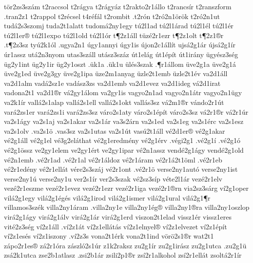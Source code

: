 {t^^f6r2zs3sz^^e1m
t2raccsol
t2r^^e1gya
t2r^^e1gy^^e1z
t2rakto2r1^^e1llo
t2rancs^^edr
t2ranszform
.tran2z1
t2rappol
t2r^^e9csel
t4r^^e9f^^e1l
t2rombit
.t2r^^f3n
t2r^^f32n1^^f6r^^f6k
t2r^^f32n1ut
tud^^e12s3szomj
tuda2t1alatt
tudom^^e12ny1egy
t^^fa2l1ad
t^^fa2l1^^e1rad
t^^fa2l1^^e9l
t^^fa2l1^^e9r
t^^fa2l1er^^ae
t^^fa2l1expo
t^^fa2l1old
t^^fa2l1^^f3r
t^^b62z1^^e1ll
t^^fcz^^e92r1ezr
t^^b62z1olt
t^^b62z1^^aer
.t^^b62z3sz
ty^^fa2k1^^f3l
.ugya2n1
^^fagy1annyi
^^fagy1is
^^fajon2c1^^e1ll^^edt
ujs^^e12g1^^e1r
^^fajs^^e12g1^^edr
^^far1assz
ut^^e12n3nyom
utas3sz^^e1ll
ut^^e1sz3sz^^e1z
^^fat1el^^e1g
^^fat1^^e9p^^edt
^^fat1ir^^e1ny
^^fcgy^^e9sz3s^^e9g
^^fcg2y1int
^^fcg2y1ir
^^fcg2y1oszt
.^^fck1a
.^^fck1u
^^fcl^^e9s3szak
.^^b6r1^^e1llom
^^fcve2g1a
^^fcve2g1^^e1
^^fcve2g1ed
^^fcve2g3gy
^^fcve2g1ipa
^^fcze2m1anyag
^^fczle2t1emb
^^fczle2t1^^e9v
va2d1^^e1ll
va2d1alm
vad^^e12sz1e
vad^^e1sz3zs
va2d1emb
va2d1evez
va2d1ideg
v^^e12d1irat
vadona2t1
va2d1^^aer
v^^e12gy1^^e1lom
va2gy1is
vagyo2n1ad
vagyo2n1^^e1tr
vagyo2n1^^fcgy
va2k1^^edr
vall^^e12s1alap
vall^^e12s1ell
vall^^e12s1okt
vall^^e1s3sz
v^^e12m1^^aer
v^^e1ndo2r1^^fat
var^^e12zs1er
var^^e12zs1i
var^^e12zs3sz
v^^e1ro2s1aty
v^^e1ro2s1^^e9p^^edt
v^^e1ro2s3sz
v^^e12r1^^aer
v^^e12r1^^far
va2s1^^e1gy
va2s1aj
va2s1akar
va2s1^^e1r
va3s2^^e1rn
va2s1ed
va2s1eg
va2s1^^e9rc
va2s1esz
va2s1olv
.va2s1^^f6
.vas3sz
va2s1utas
va2s1^^fat
vas^^fa2t1^^e1ll
v^^e92d1er^^ae
v^^e92g1akar
v^^e92g1^^e1ll
v^^e92g1el
v^^e93g2el^^e1that
v^^e92g1eredm^^e9ny
v^^e92g1^^e9rv
.v^^e9gi2g1
.v^^e92g1^^ed
.v^^e92g1^^f3
v^^e92g1^^f6ssz
ve2gy1elem
ve2gy1^^e9rt
ve2gy1ipar
v^^e92n1assz
vend^^e92g1^^e1gy
vend^^e92g1old
v^^e92n1emb
.v^^e92r1ad
.v^^e92r1al
v^^e92r1^^e1ldoz
v^^e92r1^^e1ram
v^^e92r1^^e12t1^^f6ml
.v^^e92r1eb
v^^e92r1ed^^e9ny
v^^e92r1ell^^e1t
v^^e9re2s3sz^^e1j
v^^e92r1ont
.v^^e92r1^^f6
verse2ny1aut^^f3
verse2ny1ist
verse2ny1^^fa
verse2ny1u
ver2s1^^edr
ver2s3szak
v^^e92sz3s^^edp
v^^e9te2l1^^e1r
vez^^e92r1elv
vez^^e92r1eszme
vez^^e92r1evez
vez^^e92r1ezr
vez^^e92r1iga
vez^^e92r1^^aern
via2sz3s^^e1rg
v^^ed2g1oper
vil^^e12g1egy
vil^^e12g1^^e9g^^e9s
vil^^e12g1irod
vil^^e12g1ismer
vil^^e12g1ural
vil^^e12g1^^b6r
villamos3sz^^e9k
villa2ny1^^e1ram
.villa2ny1e
villa2ny1^^e9g^^ae
villa2ny1^^aera
villa2ny1oszlop
vir^^e12g1^^e1gy
vir^^e12g1^^e1lv
vir^^e12g1^^e1r
vir^^e12g1erd
viszon2t1elad
vissz1^^e9r
vissz1eres
vit^^e92z3s^^e9g
v^^ed2z1^^e1ll
.v^^ed2z1^^e1t
v^^ed2z1ell^^e1t^^e1s
v^^ed2z1elnyel^^ae
v^^ed2z1elvezet
v^^ed2z1^^e9p^^edt
v^^ed2z1es^^e9s
v^^ed2z1iszony
.v^^ed2z3s
vona2t1^^e9rk
vona2t1ind
v^^f6r^^f62s1^^aer
wat2t1
z^^e1po2r1es^^ae
z^^e12r1^^f3ra
z^^e1szl^^f32s1^^far
z1k2raksz %
zu2g1^^edr
zu2g1ir^^e1sz
zu2g1utca
.zu2g1^^fc
zs^^e12k1utca
zse2b1atlasz
.zsi2b1^^e1r
zsili2p1^^aer
zs^^ed2r1alkohol
zs^^ed2r1ell^^e1t
zsolt^^e12r1^^edr
}
\endgroup
